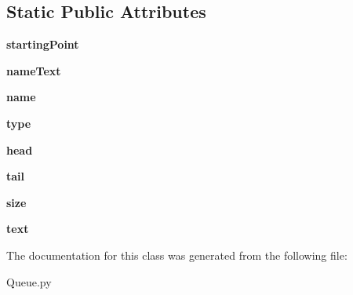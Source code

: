 \subsection*{Static Public Attributes}
\begin{DoxyCompactItemize}
\item 
\mbox{\label{class_queue_1_1_queue_ab4a0969d72be3d0fb08e02a33a985640}} 
{\bfseries starting\+Point}
\item 
\mbox{\label{class_queue_1_1_queue_a692f39189799e9729806e99e59dff97d}} 
{\bfseries name\+Text}
\item 
\mbox{\label{class_queue_1_1_queue_abd20d1d760a1275d551b4eebd709c110}} 
{\bfseries name}
\item 
\mbox{\label{class_queue_1_1_queue_a1e239f58b74790246aeec49e81f9052d}} 
{\bfseries type}
\item 
\mbox{\label{class_queue_1_1_queue_a9a2010a83cf36c0d23c2d90396cd3796}} 
{\bfseries head}
\item 
\mbox{\label{class_queue_1_1_queue_a70d68f8c761879b479bac48d291c0671}} 
{\bfseries tail}
\item 
\mbox{\label{class_queue_1_1_queue_a88cc9ea7e3c5ad6afb3635b1f493bfcd}} 
{\bfseries size}
\item 
\mbox{\label{class_queue_1_1_queue_a13809fa8a00047c724274dc36d7255e0}} 
{\bfseries text}
\end{DoxyCompactItemize}


The documentation for this class was generated from the following file\+:\begin{DoxyCompactItemize}
\item 
Queue.\+py\end{DoxyCompactItemize}
